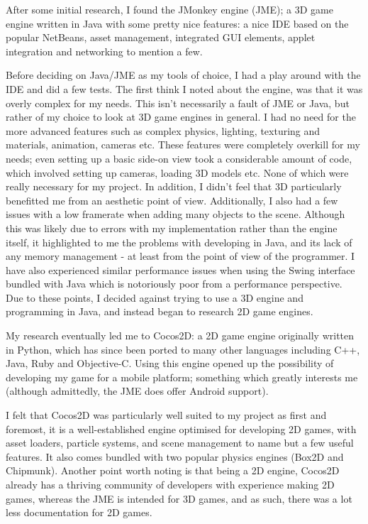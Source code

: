 \documentclass[a4paper,oneside]{report}
\begin{document}
After some initial research, I found the JMonkey engine (JME); a 3D game engine written in Java with some pretty nice features: a nice IDE based on the popular NetBeans, asset management, integrated GUI elements, applet integration and networking to mention a few. 

Before deciding on Java/JME as my tools of choice, I had a play around with the IDE and did a few tests. The first think I noted about the engine, was that it was overly complex for my needs. This isn't necessarily a fault of JME or Java, but rather of my choice to look at 3D game engines in general. I had no need for the more advanced features such as complex physics, lighting, texturing and materials, animation, cameras etc. These features were completely overkill for my needs; even setting up a basic side-on view took a considerable amount of code, which involved setting up cameras, loading 3D models etc. None of which were really necessary for my project. In addition, I didn't feel that 3D particularly benefitted me from an aesthetic point of view. Additionally, I also had a few issues with a low framerate when adding many objects to the scene. Although this was likely due to errors with my implementation rather than the engine itself, it highlighted to me the problems with developing in Java, and its lack of any memory management - at least from the point of view of the programmer. I have also experienced similar performance issues when using the Swing interface bundled with Java which is notoriously poor from a performance perspective. Due to these points, I decided against trying to use a 3D engine and programming in Java, and instead began to research 2D game engines.

My research eventually led me to Cocos2D: a 2D game engine originally written in Python, which has since been ported to many other languages including C++, Java, Ruby and Objective-C. Using this engine opened up the possibility of developing my game for a mobile platform; something which greatly interests me (although admittedly, the JME does offer Android support).

I felt that Cocos2D was particularly well suited to my project as first and foremost, it is a well-established engine optimised for developing 2D games, with asset loaders, particle systems, and scene management to name but a few useful features. It also comes bundled with two popular physics engines (Box2D and Chipmunk). Another point worth noting is that being a 2D engine, Cocos2D already has a thriving community of developers with experience making 2D games, whereas the JME is intended for 3D games, and as such, there was a lot less documentation for 2D games.
\end{document}
